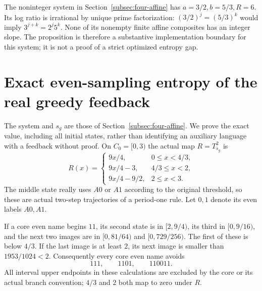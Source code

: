 \documentclass[11pt,reqno]{amsart}
\numberwithin{equation}{section}
\theoremstyle{definition}
\begin{document}
The noninteger system in Section~\ref{subsec:four-affine} has
$a=3/2,b=5/3,R=6$. Its log ratio is irrational by unique prime
factorization: $(3/2)^j=(5/3)^k$ would imply
$3^{j+k}=2^j5^k$. None of its nonempty finite affine composites
has an integer slope. The proposition is therefore a substantive
implementation boundary for this system; it is not a proof of a
strict optimized entropy gap.

\appendix
\section{Exact even-sampling entropy of the real greedy feedback}
\label{app:greedy}

The system and $s_g$ are those of Section~\ref{subsec:four-affine}.
We prove the exact value, including all initial states, rather than
identifying an auxiliary language with a feedback without proof.
On $C_0=[0,3)$ the actual map $R=T_{s_g}^2$ is
\begin{equation}\label{eq:greedy-R}
 R(x)=\begin{cases}
 9x/4,&0\le x<4/3,\\
 9x/4-3,&4/3\le x<2,\\
 9x/4-9/2,&2\le x<3.
 \end{cases}
\end{equation}
The middle state really uses $A0$ or $A1$ according to the original
threshold, so these are actual two-step trajectories of a period-one
rule. Let $0,1$ denote its even labels $A0,A1$.

If a core even name begins $11$, its second state is in
$[2,9/4)$, its third in $[0,9/16)$, and the next two images
are in $[0,81/64)$ and $[0,729/256)$. The first of these
is below $4/3$. If the last image is at least $2$, its next
image is smaller than $1953/1024<2$.
Consequently every core even name avoids
\begin{equation}\label{eq:greedy-forbidden}
 111,\qquad1101,\qquad110011.
\end{equation}
All interval upper endpoints in these calculations are excluded by
the core or its actual branch convention; $4/3$ and $2$ both
map to zero under $R$.
\end{document}
